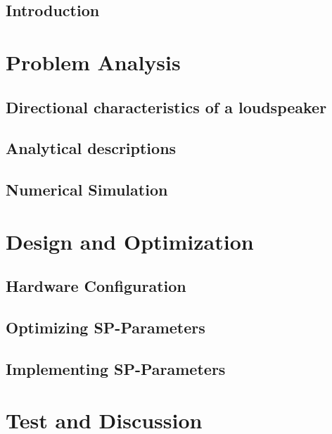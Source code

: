 \glsresetall
 \graphicspath{{figures/analysing/}}
\chapter{Introduction}

\part{Problem Analysis}\label{pt:analysis} \glsresetall
 \graphicspath{{figures/analysing/}}
	\chapter{Directional characteristics of a loudspeaker}\label{ch:directional}
		
	\chapter{Analytical descriptions}\label{ch:analytical}
		
		
		
	\chapter{Numerical Simulation}\label{ch:numerical}   



\part{Design and Optimization}\label{pt:design} 
\graphicspath{{figures/design/}}
	\chapter{Hardware Configuration}
	\chapter{Optimizing SP-Parameters}
	\chapter{Implementing SP-Parameters}



\part{Test and Discussion}\label{pt:test}
\graphicspath{{figures/tests/}}
